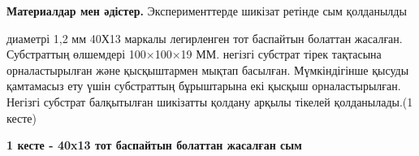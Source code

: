 {\bfseries Материалдар мен әдістер.} Эксперименттерде шикізат ретінде сым
қолданылды

диаметрі 1,2 мм 40Х13 маркалы легирленген тот баспайтын болаттан
жасалған. Субстраттың өлшемдері 100×100×19 ММ. негізгі субстрат тірек
тақтасына орналастырылған және қысқыштармен мықтап басылған.
Мүмкіндігінше қысуды қамтамасыз ету үшін субстраттың бұрыштарына екі
қысқыш орналастырылған. Негізгі субстрат балқытылған шикізатты қолдану
арқылы тікелей қолданылады.(1 кесте)

{\bfseries 1 кесте - 40x13 тот баспайтын болаттан жасалған сым}


